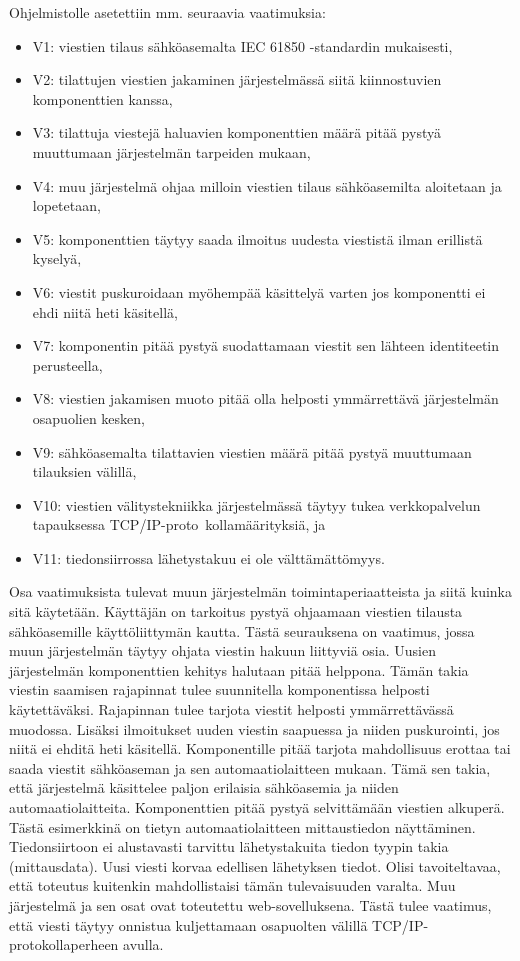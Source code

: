 Ohjelmistolle asetettiin mm. seuraavia vaatimuksia:
\begin{itemize}
	\item V1: viestien tilaus sähköasemalta IEC 61850 -standardin mukaisesti,
	\item V2: tilattujen viestien jakaminen järjestelmässä siitä kiinnostuvien komponenttien kanssa,
	\item V3: tilattuja viestejä haluavien komponenttien määrä pitää pystyä muuttumaan järjestelmän tarpeiden mukaan,
	\item V4: muu järjestelmä ohjaa milloin viestien tilaus sähköasemilta aloitetaan ja lopetetaan,
	\item V5: komponenttien täytyy saada ilmoitus uudesta viestistä ilman erillistä kyselyä,
	\item V6: viestit puskuroidaan myöhempää käsittelyä varten jos komponentti ei ehdi niitä heti käsitellä,
	\item V7: komponentin pitää pystyä suodattamaan viestit sen lähteen identiteetin perusteella,
	\item V8: viestien jakamisen muoto pitää olla helposti ymmärrettävä järjestelmän osapuolien kesken,
	\item V9: sähköasemalta tilattavien viestien määrä pitää pystyä muuttumaan tilauksien välillä,
	\item V10: viestien välitystekniikka järjestelmässä täytyy tukea verkkopalvelun tapauksessa TCP/IP-pro\-to \-kol\-la\-mää\-ri\-tyk\-si\-ä, ja
	\item V11: tiedonsiirrossa lähetystakuu ei ole välttämättömyys.
\end{itemize}

Osa vaatimuksista tulevat muun järjestelmän toimintaperiaatteista ja siitä kuinka sitä käytetään. Käyttäjän on tarkoitus pystyä ohjaamaan viestien tilausta sähköasemille käyttöliittymän kautta. Tästä seurauksena on vaatimus, jossa muun järjestelmän täytyy ohjata viestin hakuun liittyviä osia. Uusien järjestelmän komponenttien kehitys halutaan pitää helppona. Tämän takia viestin saamisen rajapinnat tulee suunnitella komponentissa helposti käytettäväksi. Rajapinnan tulee tarjota viestit helposti ymmärrettävässä muodossa. Lisäksi ilmoitukset uuden viestin saapuessa ja niiden puskurointi, jos niitä ei ehditä heti käsitellä. Komponentille pitää tarjota mahdollisuus erottaa tai saada viestit sähköaseman ja sen automaatiolaitteen mukaan. Tämä sen takia, että järjestelmä käsittelee paljon erilaisia sähköasemia ja niiden automaatiolaitteita. Komponenttien pitää pystyä selvittämään viestien alkuperä. Tästä esimerkkinä on tietyn automaatiolaitteen mittaustiedon näyttäminen. Tiedonsiirtoon ei alustavasti tarvittu lähetystakuita tiedon tyypin takia (mittausdata). Uusi viesti korvaa edellisen lähetyksen tiedot. Olisi tavoiteltavaa, että toteutus kuitenkin mahdollistaisi tämän tulevaisuuden varalta. Muu järjestelmä ja sen osat ovat toteutettu web-sovelluksena. Tästä tulee vaatimus, että viesti täytyy onnistua kuljettamaan osapuolten välillä TCP/IP-protokollaperheen avulla.



